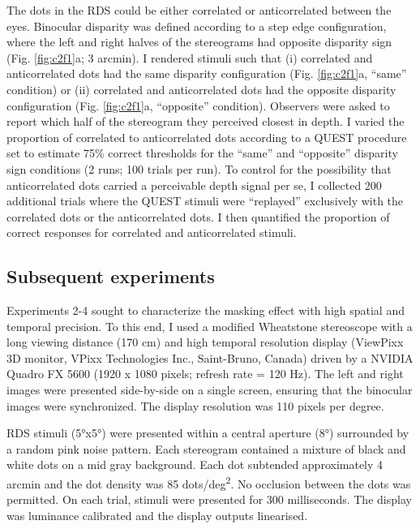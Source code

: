 The dots in the RDS could be either correlated or anticorrelated between the eyes. Binocular disparity was defined according to a step edge configuration, where the left and right halves of the stereograms had opposite disparity sign (Fig. \ref{fig:c2f1}a;  3 arcmin). I rendered stimuli such that (i) correlated and anticorrelated dots had the same disparity configuration (Fig. \ref{fig:c2f1}a, ``same'' condition) or (ii) correlated and anticorrelated dots had the opposite disparity configuration (Fig. \ref{fig:c2f1}a, ``opposite'' condition). Observers were asked to report which half of the stereogram they perceived closest in depth. I varied the proportion of correlated to anticorrelated dots according to a QUEST procedure \cite{Watson:1983aa} set to estimate 75\% correct thresholds for the ``same'' and ``opposite'' disparity sign conditions (2 runs; 100 trials per run).
To control for the possibility that anticorrelated dots carried a perceivable depth signal per se, I collected 200 additional trials where the QUEST stimuli were ``replayed'' exclusively with the correlated dots or the anticorrelated dots. I then quantified the proportion of correct responses for correlated and anticorrelated stimuli. 

\subsection{Subsequent experiments}
Experiments 2-4 sought to characterize the masking effect with high spatial and temporal precision. To this end, I used a modified Wheatstone stereoscope with a long viewing distance (170 cm) and high temporal resolution display (ViewPixx 3D monitor, VPixx Technologies Inc., Saint-Bruno, Canada) driven by a NVIDIA Quadro FX 5600 (1920 x 1080 pixels; refresh rate = 120 Hz). The left and right images were presented side-by-side on a single screen, ensuring that the binocular images were synchronized. The display resolution was 110 pixels per degree.

RDS stimuli (\ang{5}x\ang{5}) were presented within a central aperture (\ang{8}) surrounded by a random pink noise pattern. Each stereogram contained a mixture of black and white dots on a mid gray background. Each dot subtended approximately 4 arcmin and the dot density was 85 dots/deg\textsuperscript{2}. No occlusion between the dots was permitted. On each trial, stimuli were presented for 300 milliseconds. The display was luminance calibrated and the display outputs linearised.

